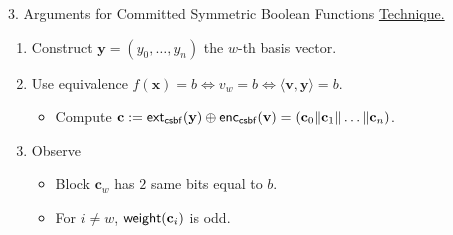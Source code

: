 \begin{frame}{3. Arguments for Committed Symmetric Boolean Functions}
	\underline{Technique.}\pause
	\begin{enumerate}
		\item Construct $\mathbf{y} = (y_0, \dots, y_n)$ the $w$-th basis vector.\pause
		\item Use equivalence $f(\mathbf{x}) = b \iff v_w = b \iff \langle\mathbf{v}, \mathbf{y}\rangle=b$.\pause
		\begin{itemize}
			\item Compute $\mathbf{c} := \mathsf{ext}_{\mathsf{csbf}}(\mathbf{y}) \oplus \mathsf{enc}_{\mathsf{csbf}}(\mathbf{v}) = (\mathbf{c}_0 \Vert \mathbf{c}_1\Vert \dots\Vert \mathbf{c}_n)$.\pause
		\end{itemize}
		\item Observe\pause
		\begin{itemize}
			\item Block $\mathbf{c}_w$ has $2$ same bits equal to $b$.\pause
			\item For $i \neq w$, $\mathsf{weight}(\mathbf{c}_i)$ is odd.
		\end{itemize}
	\end{enumerate}
\end{frame}